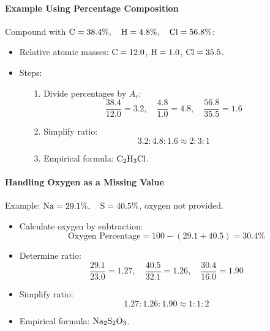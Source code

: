 \paragraph{Example Using Percentage Composition}
Compound with $\ce{C} = 38.4 \%, \quad \ce{H} = 4.8 \%, \quad \ce{Cl} = 56.8 \%$:
\begin{itemize}
    \item Relative atomic masses: $\ce{C} = 12.0$, $\ce{H} = 1.0$, $\ce{Cl} = 35.5$.
    \item Steps:
    \begin{itemize}
        \item[1.] Divide percentages by $A_r$:
        \begin{equation}
            \frac{38.4}{12.0} = 3.2, \quad \frac{4.8}{1.0} = 4.8, \quad \frac{56.8}{35.5} = 1.6
        \end{equation}
        \item[2.] Simplify ratio:
        \begin{equation}
            3.2 : 4.8 : 1.6 \approx 2 : 3 : 1
        \end{equation}
        \item[3.] Empirical formula: $\ce{C2H3Cl}$.
    \end{itemize}
\end{itemize}

\paragraph{Handling Oxygen as a Missing Value}
Example: $\ce{Na} = 29.1 \%, \quad \ce{S} = 40.5 \%$, oxygen not provided.
\begin{itemize}
    \item Calculate oxygen by subtraction:
    \begin{equation}
        \text{Oxygen Percentage} = 100 - \left(29.1 + 40.5\right) = 30.4 \%
    \end{equation}
    \item Determine ratio:
    \begin{equation}
        \frac{29.1}{23.0} = 1.27, \quad \frac{40.5}{32.1} = 1.26, \quad \frac{30.4}{16.0} = 1.90
    \end{equation}
    \item Simplify ratio:
    \begin{equation}
        1.27 : 1.26 : 1.90 \approx 1 : 1 : 2
    \end{equation}
    \item Empirical formula: $\ce{Na2S2O3}$.
\end{itemize}

